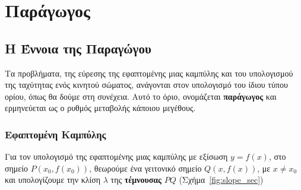 \chapter{Παράγωγος}

\section{Η Έννοια της Παραγώγου}

Τα προβλήματα, της εύρεσης της εφαπτομένης μιας καμπύλης και του υπολογισμού της 
ταχύτητας ενός κινητού σώματος, ανάγονται στον υπολογισμό του ίδιου τύπου ορίου, 
όπως θα δούμε στη συνέχεια. Αυτό το όριο, ονομάζεται \textbf{παράγωγος} και ερμηνεύεται 
ως ο ρυθμός μεταβολής κάποιου μεγέθους.

\subsection{Εφαπτομένη Καμπύλης}

Για τον υπολογισμό της εφαπτομένης μιας καμπύλης με εξίσωση $ y=f(x) $, στο 
σημείο $P( x_{0}, f(x_{0})) $, θεωρούμε ένα γειτονικό σημείο $ Q(x,f(x)) $, με 
$ x \neq x_{0} $ και υπολογίζουμε την κλίση $\lambda$ της \textbf{τέμνουσας} $ PQ $
(Σχήμα~\ref{fig:slope_sec})

